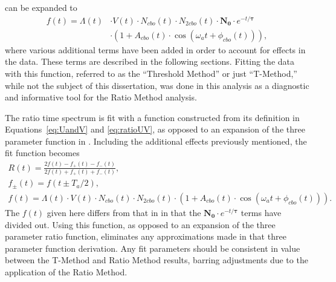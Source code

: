  can be expanded to 
    \begin{equation}
    \begin{aligned}
        f(t) = \Lambda(t)& \cdot V(t) \cdot N_{cbo}(t) \cdot N_{2cbo}(t) \cdot \boldsymbol{N_{0}} \cdot e^{-t/\boldsymbol{\tau}}  \\
         & \cdot (1 + A_{cbo}(t) \cdot \cos(\omega_{a}t + \phi_{cbo}(t))),
    \label{eq:TmethodFunction}
    \end{aligned}
    \end{equation}
where various additional terms have been added in order to account for effects in the data. These terms are described in the following sections. Fitting the data with this function, referred to as the ``Threshold Method'' or just ``T-Method,'' while not the subject of this dissertation, was done in this analysis as a diagnostic and informative tool for the Ratio Method analysis. 


The ratio time spectrum is fit with a function constructed from its definition in Equations~\ref{eq:UandV} and \ref{eq:ratioUV}, as opposed to an expansion of the three parameter function in . Including the additional effects previously mentioned, the fit function becomes
    \begin{gather}
        R(t) = \frac{2f(t) - f_{+}(t) - f_{-}(t)}{2f(t) + f_{+}(t) + f_{-}(t)}, \\
        f_{\pm}(t) = f(t \pm T_{a}/2), \\
        f(t) = \Lambda(t) \cdot V(t) \cdot N_{cbo}(t) \cdot N_{2cbo}(t) \cdot (1 + A_{cbo}(t) \cdot \cos(\omega_{a}t + \phi_{cbo}(t))).
    \label{eq:fullratiofunction}
    \end{gather}
The $f(t)$ given here differs from that in  in that the $\boldsymbol{N_{0}} \cdot e^{-t/\boldsymbol{\tau}}$ terms have divided out. Using this function, as opposed to an expansion of the three parameter ratio function, eliminates any approximations made in that three parameter function derivation. Any fit parameters should be consistent in value between the T-Method and Ratio Method results, barring adjustments due to the application of the Ratio Method. 


